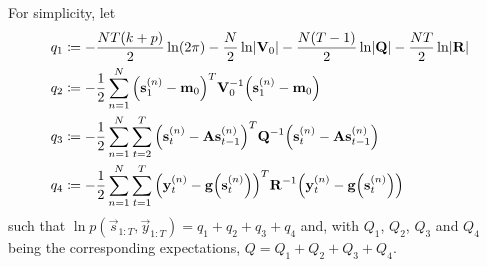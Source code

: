 	For simplicity, let
	\begin{align*}
		q_1 &\coloneqq -\frac{NT(k + p)}{2} \ln(2\pi) - \frac{N}{2} \ln \lvert \boldsymbol{\mathrm{V}}_0 \rvert - \frac{N(T - 1)}{2} \ln \lvert \boldsymbol{\mathrm{Q}} \rvert - \frac{NT}{2} \ln \lvert \boldsymbol{\mathrm{R}} \rvert \\
		q_2 &\coloneqq -\frac{1}{2} \sum_{n = 1}^{N} \Big( \boldsymbol{\mathrm{s}}_1^{(n)} - \boldsymbol{\mathrm{m}}_0 \Big)^T \boldsymbol{\mathrm{V}}_0^{-1} \Big( \boldsymbol{\mathrm{s}}_1^{(n)} - \boldsymbol{\mathrm{m}}_0 \Big) \\
		q_3 &\coloneqq -\frac{1}{2} \sum_{n = 1}^{N} \sum_{t = 2}^{T} \Big( \boldsymbol{\mathrm{s}}_t^{(n)} - \boldsymbol{\mathrm{A}} \boldsymbol{\mathrm{s}}_{t - 1}^{(n)} \Big)^T \boldsymbol{\mathrm{Q}}^{-1} \Big( \boldsymbol{\mathrm{s}}_t^{(n)} - \boldsymbol{\mathrm{A}} \boldsymbol{\mathrm{s}}_{t - 1}^{(n)} \Big) \\
		q_4 &\coloneqq -\frac{1}{2} \sum_{n = 1}^{N} \sum_{t = 1}^{T} \Big( \boldsymbol{\mathrm{y}}_t^{(n)} - \boldsymbol{\mathrm{g}}\Big(\boldsymbol{\mathrm{s}}_t^{(n)}\Big) \Big)^T \boldsymbol{\mathrm{R}}^{-1} \Big( \boldsymbol{\mathrm{y}}_t^{(n)} - \boldsymbol{\mathrm{g}}\Big(\boldsymbol{\mathrm{s}}_t^{(n)}\Big) \Big)
	\end{align*}
	such that \( \ln p(\vec{s}_{1:T}, \vec{y}_{1:T}) = q_1 + q_2 + q_3 + q_4 \) and, with \(Q_1\), \(Q_2\), \(Q_3\) and \(Q_4\) being the corresponding expectations, \( Q = Q_1 + Q_2 + Q_3 + Q_4 \).
	
